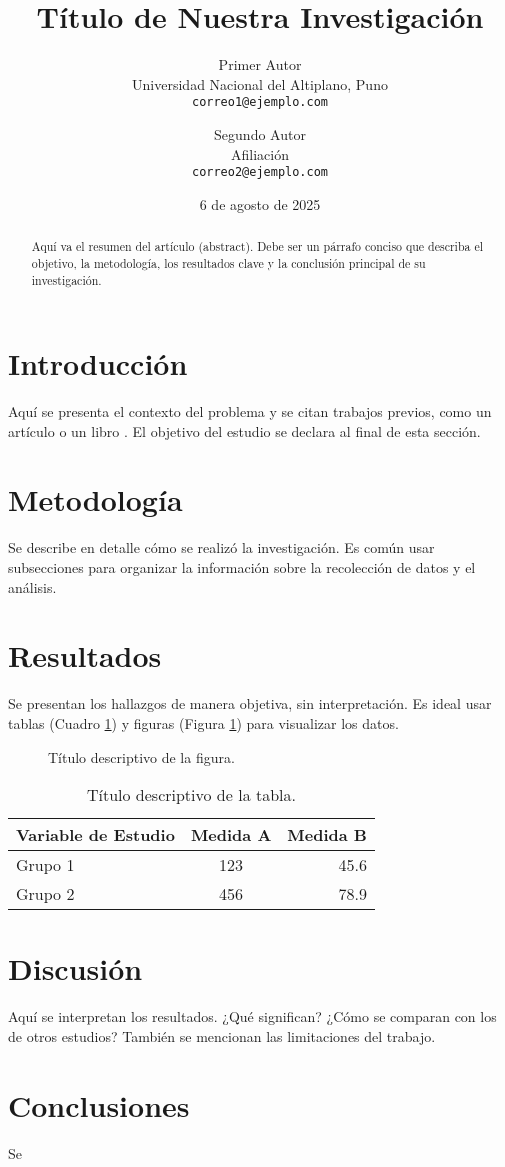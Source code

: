 \documentclass[12pt, a4paper]{article}
\title{Título de Nuestra Investigación}
\author{
  Primer Autor\\
  \small Universidad Nacional del Altiplano, Puno\\
  \small \texttt{correo1@ejemplo.com}
  \and
  Segundo Autor\\
  \small Afiliación\\
  \small \texttt{correo2@ejemplo.com}
}
\date{6 de agosto de 2025}
\begin{document}
\maketitle

\begin{abstract}
\noindent
Aquí va el resumen del artículo (abstract). Debe ser un párrafo conciso que describa el objetivo, la metodología, los resultados clave y la conclusión principal de su investigación.
\end{abstract}

\tableofcontents
\newpage

\section{Introducción}
Aquí se presenta el contexto del problema y se citan trabajos previos, como un artículo \cite{autor2025articulo} o un libro \cite{autor2024libro}. El objetivo del estudio se declara al final de esta sección.

\section{Metodología}
Se describe en detalle cómo se realizó la investigación. Es común usar subsecciones para organizar la información sobre la recolección de datos y el análisis.

\section{Resultados}
Se presentan los hallazgos de manera objetiva, sin interpretación. Es ideal usar tablas (Cuadro \ref{tab:ejemplo}) y figuras (Figura \ref{fig:ejemplo}) para visualizar los datos.

\begin{figure}[h!]
  \centering
  \caption{Título descriptivo de la figura.}
  \label{fig:ejemplo}
\end{figure}

\begin{table}[h!]
  \centering
  \begin{tabular}{|l|c|r|}
    \hline
    Variable de Estudio & Medida A & Medida B \\
    \hline
    Grupo 1 & 123 & 45.6 \\
    Grupo 2 & 456 & 78.9 \\
    \hline
  \end{tabular}
  \caption{Título descriptivo de la tabla.}
  \label{tab:ejemplo}
\end{table}

\section{Discusión}
Aquí se interpretan los resultados. ¿Qué significan? ¿Cómo se comparan con los de otros estudios? También se mencionan las limitaciones del trabajo.

\section{Conclusiones}
Se
\end{document}
